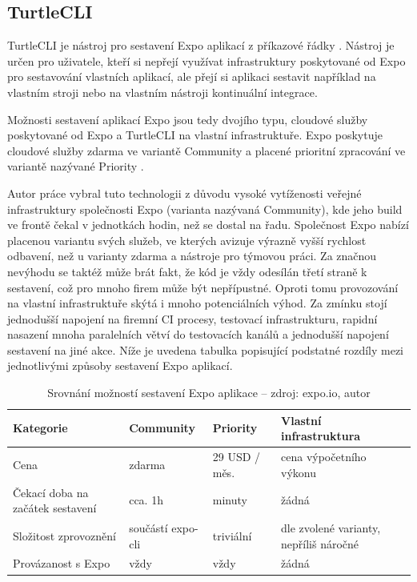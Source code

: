 \subsection{TurtleCLI}

TurtleCLI je nástroj pro sestavení Expo aplikací z příkazové řádky \cite{Sokal2019}. Nástroj je určen pro uživatele, kteří si nepřejí využívat infrastruktury poskytované od Expo pro sestavování vlastních aplikací, ale přejí si aplikaci sestavit například na vlastním stroji nebo na vlastním nástroji kontinuální integrace.

Možnosti sestavení aplikací Expo jsou tedy dvojího typu, cloudové služby poskytované od Expo a TurtleCLI na vlastní infrastruktuře. Expo poskytuje cloudové služby zdarma ve variantě Community a placené prioritní zpracování ve variantě nazývané Priority \cite{expoDevServices}.

Autor práce vybral tuto technologii z důvodu vysoké vytíženosti veřejné infrastruktury společnosti Expo (varianta nazývaná Community), kde jeho build ve frontě čekal v jednotkách hodin, než se dostal na řadu. Společnost Expo nabízí placenou variantu svých služeb, ve kterých avizuje výrazně vyšší rychlost odbavení, než u varianty zdarma a nástroje pro týmovou práci. Za značnou nevýhodu se taktéž může brát fakt, že kód je vždy odesílán třetí straně k sestavení, což pro mnoho firem může být nepřípustné. Oproti tomu provozování na vlastní infrastruktuře skýtá i mnoho potenciálních výhod. Za zmínku stojí jednodušší napojení na firemní CI procesy, testovací infrastrukturu, rapidní nasazení mnoha paralelních větví do testovacích kanálů a jednodušší napojení sestavení na jiné akce. Níže je uvedena tabulka popisující podstatné rozdíly mezi jednotlivými způsoby sestavení Expo aplikací. 

\begin{table}[H]
	\begin{tabularx}{\textwidth}{|X|X|X|X|}
		\hline
		Kategorie                        & Community         & Priority      & Vlastní infrastruktura                 \\
		\hline
		Cena                             & zdarma            & 29 USD / měs. & cena výpočetního výkonu                \\
		\hline
		Čekací doba na začátek sestavení & cca. 1h           & minuty        & žádná                                  \\
		\hline
		Složitost zprovoznění            & součástí expo-cli & triviální     & dle zvolené varianty, nepříliš náročné \\
		\hline
		Provázanost s Expo               & vždy              & vždy          & žádná \\     
		\hline             
	\end{tabularx}
	\caption[Srovnání možností sestavení Expo aplikace]{Srovnání možností sestavení Expo aplikace -- zdroj: expo.io, autor}
\end{table}